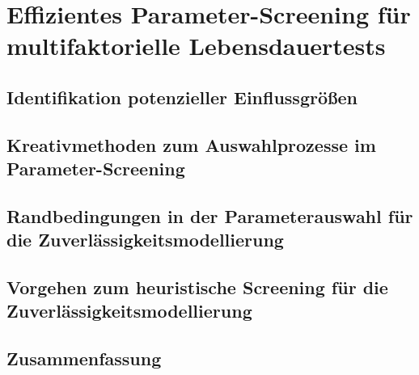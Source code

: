 

\chapter{Effizientes Parameter-Screening für multifaktorielle Lebensdauertests}

\section{Identifikation potenzieller Einflussgrößen}

\section[\texorpdfstring{Kreativmethoden zum Auswahlprozesse im \\ Parameter-Screening}{Kreativmethoden}]
 {Kreativmethoden zum Auswahlprozesse im Parameter-Screening}


\section{Randbedingungen in der Parameterauswahl für die Zuverlässigkeitsmodellierung}

\section{Vorgehen zum heuristische Screening für die Zuverlässigkeitsmodellierung}

\section{Zusammenfassung}